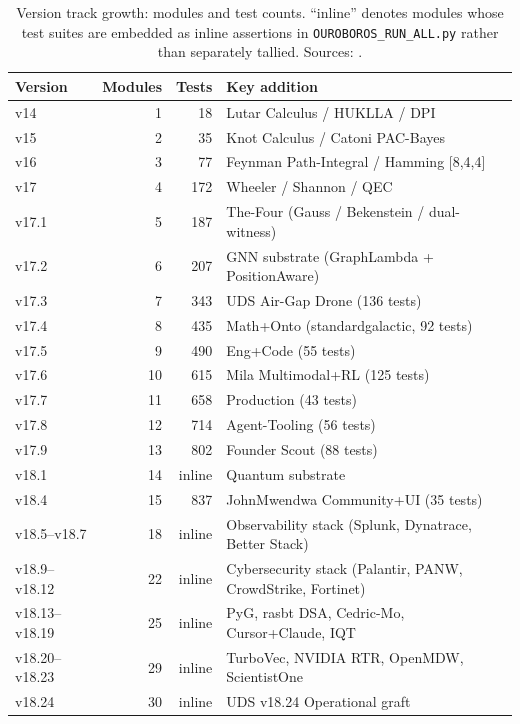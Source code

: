 \begin{table}[ht]
\centering
\begin{tabular}{lrrl}
\textbf{Version} & \textbf{Modules} & \textbf{Tests} & \textbf{Key addition} \\
\hline
v14 & 1 & 18 & Lutar Calculus / HUKLLA / DPI \\
v15 & 2 & 35 & Knot Calculus / Catoni PAC-Bayes \\
v16 & 3 & 77 & Feynman Path-Integral / Hamming [8,4,4] \\
v17 & 4 & 172 & Wheeler / Shannon / QEC \\
v17.1 & 5 & 187 & The-Four (Gauss / Bekenstein / dual-witness) \\
v17.2 & 6 & 207 & GNN substrate (GraphLambda + PositionAware) \\
v17.3 & 7 & 343 & UDS Air-Gap Drone (136 tests) \\
v17.4 & 8 & 435 & Math+Onto (standardgalactic, 92 tests) \\
v17.5 & 9 & 490 & Eng+Code (55 tests) \\
v17.6 & 10 & 615 & Mila Multimodal+RL (125 tests) \\
v17.7 & 11 & 658 & Production (43 tests) \\
v17.8 & 12 & 714 & Agent-Tooling (56 tests) \\
v17.9 & 13 & 802 & Founder Scout (88 tests) \\
v18.1 & 14 & inline & Quantum substrate \\
v18.4 & 15 & 837 & JohnMwendwa Community+UI (35 tests) \\
v18.5--v18.7 & 18 & inline & Observability stack (Splunk, Dynatrace, Better Stack) \\
v18.9--v18.12 & 22 & inline & Cybersecurity stack (Palantir, PANW, CrowdStrike, Fortinet) \\
v18.13--v18.19 & 25 & inline & PyG, rasbt DSA, Cedric-Mo, Cursor+Claude, IQT \\
v18.20--v18.23 & 29 & inline & TurboVec, NVIDIA RTR, OpenMDW, ScientistOne \\
v18.24 & 30 & inline & UDS v18.24 Operational graft \\
\end{tabular}
\caption{Version track growth: modules and test counts.  ``inline'' denotes
  modules whose test suites are embedded as inline assertions in
  \texttt{OUROBOROS\_RUN\_ALL.py} rather than separately tallied.
  Sources: \cite{szl_master_v18,szl_zoom_out_v18}.}
\label{tab:version-growth}
\end{table}

